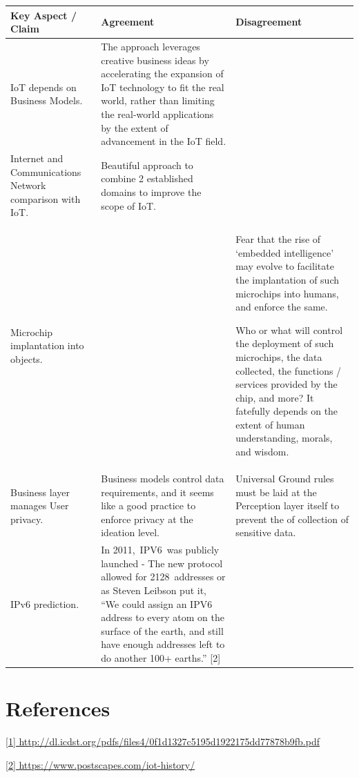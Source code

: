 \documentclass[12pt,a4paper, india]{article}
\begin{document}
    \begin{tabular}{ |p{4cm}||p{5.7cm}|p{5.7cm}|  }
    \hline
    Key Aspect / Claim & Agreement & Disagreement\\
    \hline
     
    IoT depends on Business Models.   & 
    The approach leverages creative business ideas by accelerating the expansion of IoT technology to fit the real world, rather than limiting the real-world applications by the extent of advancement in the IoT field.    &
    \\ \hline
     
    Internet and Communications Network comparison with IoT. &   
    Beautiful approach to combine 2 established domains to improve the scope of IoT.  & 
    \\ \hline

    Microchip implantation into objects. &   
    & 
    Fear that the rise of ‘embedded intelligence’ may evolve to facilitate the implantation of such microchips into humans, and enforce the same.
     
    Who or what will control the deployment of such microchips, the data collected, the functions / services provided by the chip, and more? It fatefully depends on the extent of human understanding, morals, and wisdom.
    \\ \hline

    Business layer manages User privacy. &   
    Business models control data requirements, and it seems like a good practice to enforce privacy at the ideation level.  & 
    Universal Ground rules must be laid at the Perception layer itself to prevent the of collection of sensitive data.
    \\ \hline

    IPv6 prediction. &   
    In 2011, IPV6 was publicly launched - The new protocol allowed for 2128 addresses or as Steven Leibson put it, “We could assign an IPV6 address to every atom on the surface of the earth, and still have enough addresses left to do another 100+ earths.” [2] &
    \\ \hline
    
    \end{tabular}

\section{References}

\href{http://dl.icdst.org/pdfs/files4/0f1d1327c5195d1922175dd77878b9fb.pdf}{[1] http://dl.icdst.org/pdfs/files4/0f1d1327c5195d1922175dd77878b9fb.pdf}

\href{https://www.postscapes.com/iot-history/}{[2] https://www.postscapes.com/iot-history/}
\end{document}
